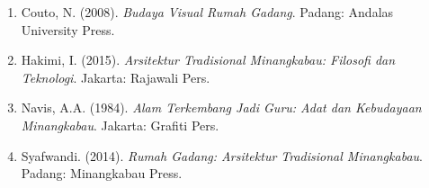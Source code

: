 \documentclass[12pt,a4paper]{article}
\begin{document}
\begin{enumerate}
\item Couto, N. (2008). \textit{Budaya Visual Rumah Gadang}. Padang: Andalas University Press.
\item Hakimi, I. (2015). \textit{Arsitektur Tradisional Minangkabau: Filosofi dan Teknologi}. Jakarta: Rajawali Pers.
\item Navis, A.A. (1984). \textit{Alam Terkembang Jadi Guru: Adat dan Kebudayaan Minangkabau}. Jakarta: Grafiti Pers.
\item Syafwandi. (2014). \textit{Rumah Gadang: Arsitektur Tradisional Minangkabau}. Padang: Minangkabau Press.
\end{enumerate}
\end{document}
